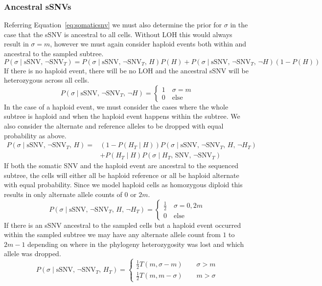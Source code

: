 \documentclass[../../main.tex]{subfiles}
\begin{document}
\subsubsection*{Ancestral sSNVs}
Referring Equation~\eqref{eq:somaticsnv} we must also determine the prior for $\sigma$ in the case that the sSNV is ancestral to all cells.
Without LOH this would always result in $\sigma=m$, however we must again consider haploid events both within and ancestral to the sampled subtree.
\begin{equation} \label{eq:ancestralsnv}
P(\sigma\mid\text{sSNV},\,\neg\text{SNV}_T)=P(\sigma\mid\text{sSNV},\,\neg\text{SNV}_T,\,H)P(H)+P(\sigma\mid\text{sSNV},\,\neg\text{SNV}_T,\,\neg H)(1-P(H))
\end{equation}
If there is no haploid event, there will be no LOH and the ancestral sSNV will be heterozygous across all cells.
\begin{equation*}
P(\sigma\mid\text{sSNV},\,\neg\text{SNV}_T,\,\neg H) = \begin{cases}1\quad \sigma=m\\ 0\quad\text{else}\end{cases}
\end{equation*}
In the case of a haploid event, we must consider the cases where the whole subtree is haploid and when the haploid event happens within the subtree.
We also consider the alternate and reference alleles to be dropped with equal probability as above.
\begin{align*}
P(\sigma\mid\text{sSNV},\,\neg\text{SNV}_T,\,H)=&(1-P(H_T\mid H))P(\sigma\mid \text{sSNV},\,\neg\text{SNV}_T,\,H,\,\neg H_T)\\
&+P(H_T\mid H)P(\sigma\mid H_T,\,\text{SNV},\,\neg\text{SNV}_T)
\end{align*}
If both the somatic SNV and the haploid event are ancestral to the sequenced subtree, the cells will either all be haploid reference or all be haploid alternate with equal probability.
Since we model haploid cells as homozygous diploid this results in only alternate allele counts of $0$ or $2m$.
\begin{equation*}
P(\sigma\mid\text{sSNV},\,\neg\text{SNV}_T,\,H,\,\neg H_T)= \begin{cases} \frac{1}{2} \quad \sigma=0,2m\\0\quad \text{else} \end{cases}
\end{equation*}
If there is an sSNV ancestral to the sampled cells but a haploid event occurred within the sampled subtree we may have any alternate allele count from $1$ to $2m-1$ depending on where in the phylogeny heterozygosity was lost and which allele was dropped.
\begin{equation*}
P(\sigma\mid\text{sSNV},\,\neg\text{SNV}_T,\,H_T) = \begin{cases} \frac{1}{2}T(m,\sigma-m)\qquad \sigma > m\\
\frac{1}{2}T(m,m-\sigma)\qquad m > \sigma \end{cases}
\end{equation*}
\end{document}
